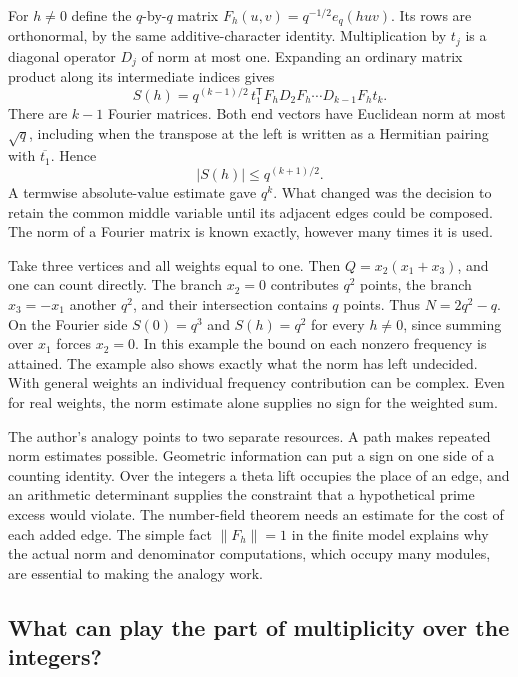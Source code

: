 \documentclass[11pt,letterpaper]{article}
\begin{document}
For \(h\ne0\) define the \(q\)-by-\(q\) matrix \(F_h(u,v)=q^{-1/2}e_q(huv)\). Its rows are orthonormal, by the same additive-character identity. Multiplication by \(t_j\) is a diagonal operator \(D_j\) of norm at most one. Expanding an ordinary matrix product along its intermediate indices gives
\[
 S(h)=q^{(k-1)/2}\, t_1^{\mathsf T}F_h D_2 F_h \cdots D_{k-1}F_h t_k .
\]
There are \(k-1\) Fourier matrices. Both end vectors have Euclidean norm at most \(\sqrt q\), including when the transpose at the left is written as a Hermitian pairing with \(\overline{t_1}\). Hence
\[
                |S(h)|\le q^{(k+1)/2}.
\]
A termwise absolute-value estimate gave \(q^k\). What changed was the decision to retain the common middle variable until its adjacent edges could be composed. The norm of a Fourier matrix is known exactly, however many times it is used.

Take three vertices and all weights equal to one. Then \(Q=x_2(x_1+x_3)\), and one can count directly. The branch \(x_2=0\) contributes \(q^2\) points, the branch \(x_3=-x_1\) another \(q^2\), and their intersection contains \(q\) points. Thus \(N=2q^2-q\). On the Fourier side \(S(0)=q^3\) and \(S(h)=q^2\) for every \(h\ne0\), since summing over \(x_1\) forces \(x_2=0\). In this example the bound on each nonzero frequency is attained. The example also shows exactly what the norm has left undecided. With general weights an individual frequency contribution can be complex. Even for real weights, the norm estimate alone supplies no sign for the weighted sum.

The author's analogy points to two separate resources. A path makes repeated norm estimates possible. Geometric information can put a sign on one side of a counting identity. Over the integers a theta lift occupies the place of an edge, and an arithmetic determinant supplies the constraint that a hypothetical prime excess would violate. The number-field theorem needs an estimate for the cost of each added edge. The simple fact \(\|F_h\|=1\) in the finite model explains why the actual norm and denominator computations, which occupy many modules, are essential to making the analogy work.

\subsection{What can play the part of multiplicity over the integers?}
\end{document}
